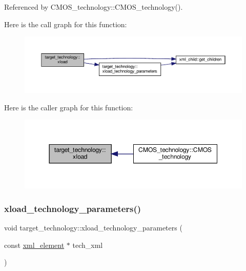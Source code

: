 Referenced by C\+M\+O\+S\+\_\+technology\+::\+C\+M\+O\+S\+\_\+technology().

Here is the call graph for this function\+:
\nopagebreak
\begin{figure}[H]
\begin{center}
\leavevmode
\includegraphics[width=350pt]{d8/d05/classtarget__technology_aef59dfe918223198c592fa318f56de2b_cgraph}
\end{center}
\end{figure}
Here is the caller graph for this function\+:
\nopagebreak
\begin{figure}[H]
\begin{center}
\leavevmode
\includegraphics[width=350pt]{d8/d05/classtarget__technology_aef59dfe918223198c592fa318f56de2b_icgraph}
\end{center}
\end{figure}
\mbox{\label{classtarget__technology_a272517464925f914dae13b88d269e439}} 
\subsubsection{\texorpdfstring{xload\+\_\+technology\+\_\+parameters()}{xload\_technology\_parameters()}}
{\footnotesize\ttfamily void target\+\_\+technology\+::xload\+\_\+technology\+\_\+parameters (\begin{DoxyParamCaption}\item[{const \hyperlink{classxml__element}{xml\+\_\+element} $\ast$}]{tech\+\_\+xml }\end{DoxyParamCaption})\hspace{0.3cm}{\ttfamily [protected]}}




